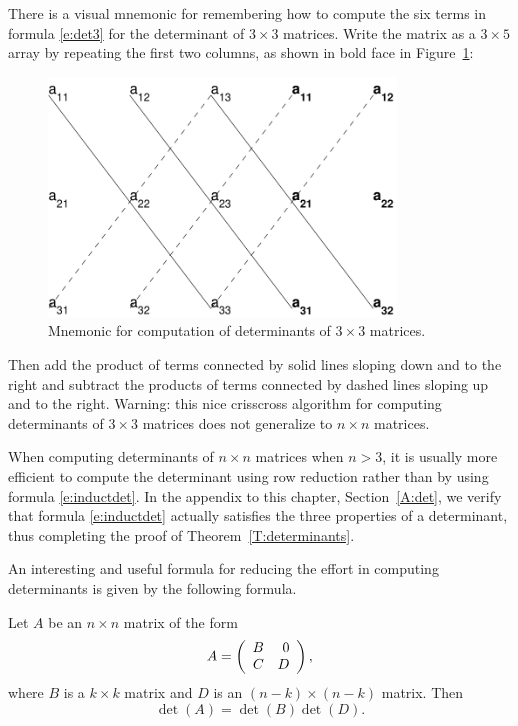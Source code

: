 \documentclass{ximera}
\begin{document}
There is a visual mnemonic for remembering how to compute the six
terms in formula \eqref{e:det3} for the determinant of 
$3\times 3$ matrices.
Write the matrix as a $3\times 5$ array by repeating the first 
two columns, as shown in bold face in Figure~\ref{F:det3}:
\begin{figure}[htb]
           \centerline{%
            \includegraphics[height=2.5in]{../figures/det3.pdf}}
           \caption{Mnemonic for computation of determinants of 
		$3\times 3$ matrices.}
           \label{F:det3}
\end{figure}
Then add the product of terms connected by solid lines sloping down and 
to the right and subtract the products of terms connected by dashed lines 
sloping up and to the right.  Warning: this nice crisscross algorithm 
for computing determinants of $3\times 3$ matrices does not generalize 
to $n\times n$ matrices.
 
When computing determinants of $n\times n$ matrices when $n>3$,
it is usually more efficient to compute the determinant using row
reduction rather than by using formula \eqref{e:inductdet}.  In the
appendix to this chapter, Section~\ref{A:det}, we verify that formula 
\eqref{e:inductdet} actually satisfies the three properties of a determinant, 
thus completing the proof of Theorem~\ref{T:determinants}.  

An interesting and useful formula for reducing the effort in 
computing determinants is given by the following formula.
\begin{lemma} \label{L:detblockdiag}
Let $A$ be an $n\times n$ matrix of the form
\[
A=\left(\begin{array}{rr} B & 0\\ C &D\end{array}\right),
\]
where $B$ is a $k\times k$ matrix and $D$ is an $(n-k)\times(n-k)$
matrix.  Then
\[
\det(A)=\det(B)\det(D).
\]
\end{lemma}
\end{document}
